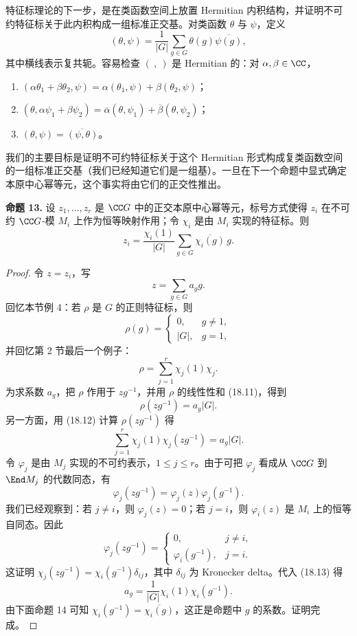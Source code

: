 特征标理论的下一步，是在类函数空间上放置 Hermitian 内积结构，并证明不可约特征标关于此内积构成一组标准正交基。对类函数 $\theta$ 与 $\psi$，定义
\[
  (\theta,\psi)=\frac1{|G|}\sum_{g\in G}\theta(g)\overline{\psi(g)},
\]
其中横线表示复共轭。容易检查 $(\ ,\ )$ 是 Hermitian 的：对 $\alpha,\beta\in\CC$，
\begin{enumerate}[label=(\alph*)]
  \item $(\alpha\theta_1+\beta\theta_2,
  \psi)=\alpha(\theta_1,
  \psi)+\beta(\theta_2,
  \psi)$；
  \item $(\theta,
  \alpha\psi_1+\beta\psi_2)=\overline{\alpha}(\theta,
  \psi_1)+\overline{\beta}(\theta,
  \psi_2)$；
  \item $(\theta,
  \psi)=\overline{(\psi,
  \theta)}$。
\end{enumerate}

我们的主要目标是证明不可约特征标关于这个 Hermitian 形式构成复类函数空间的一组标准正交基（我们已经知道它们是一组基）。一旦在下一个命题中显式确定本原中心幂等元，这个事实将由它们的正交性推出。

\medskip
\noindent\textbf{命题 13.} 设 $z_1,
\ldots,z_r$ 是 $\CC G$ 中的正交本原中心幂等元，标号方式使得 $z_i$ 在不可约 $\CC G$-模 $M_i$ 上作为恒等映射作用；令 $\chi_i$ 是由 $M_i$ 实现的特征标。则
\[
  z_i=\frac{\chi_i(1)}{|G|}\sum_{g\in G}\overline{\chi_i(g)}\,g.
\]

\begin{proof}
令 $z=z_i$，写
\[
  z=\sum_{g\in G}a_g g.
\]
回忆本节例 4：若 $\rho$ 是 $G$ 的正则特征标，则
\[
  \rho(g)=\begin{cases}
  0,&g\neq1,\\
  |G|,&g=1,
  \end{cases}
  \tag{18.11}
\]
并回忆第 2 节最后一个例子：
\[
  \rho=\sum_{j=1}^r\chi_j(1)\chi_j.
  \tag{18.12}
\]
为求系数 $a_g$，把 $\rho$ 作用于 $zg^{-1}$，并用 $\rho$ 的线性性和 (18.11)，得到
\[
  \rho(zg^{-1})=a_g|G|.
\]
另一方面，用 (18.12) 计算 $\rho(zg^{-1})$ 得
\[
  \sum_{j=1}^r\chi_j(1)\chi_j(zg^{-1})=a_g|G|.
  \tag{18.13}
\]
令 $\varphi_j$ 是由 $M_j$ 实现的不可约表示，$1\leq j\leq r$。由于可把 $\varphi_j$ 看成从 $\CC G$ 到 $\End M_j$ 的代数同态，有
\[
  \varphi_j(zg^{-1})=\varphi_j(z)\varphi_j(g^{-1}).
\]
我们已经观察到：若 $j\neq i$，则 $\varphi_j(z)=0$；若 $j=i$，则 $\varphi_i(z)$ 是 $M_i$ 上的恒等自同态。因此
\[
  \varphi_j(zg^{-1})=\begin{cases}
  0,&j\neq i,\\
  \varphi_i(g^{-1}),&j=i.
  \end{cases}
\]
这证明 $\chi_j(zg^{-1})=\chi_i(g^{-1})\delta_{ij}$，其中 $\delta_{ij}$ 为 Kronecker delta。代入 (18.13) 得
\[
  a_g=\frac1{|G|}\chi_i(1)\chi_i(g^{-1}).
\]
由下面命题 14 可知 $\chi_i(g^{-1})=\overline{\chi_i(g)}$，这正是命题中 $g$ 的系数。证明完成。
\end{proof}

